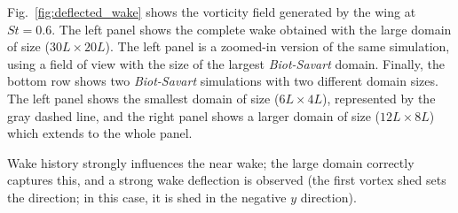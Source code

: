 \documentclass[preprint,12pt]{elsarticle}
\begin{document}
Fig.~\ref{fig:deflected_wake} shows the vorticity field generated by the wing at $St=0.6$. The left panel shows the complete wake obtained with the large domain of size ($30L\times20L$). The left panel is a zoomed-in version of the same simulation, using a field of view with the size of the largest \emph{Biot-Savart} domain. Finally, the bottom row shows two \emph{Biot-Savart} simulations with two different domain sizes. The left panel shows the smallest domain of size ($6L\times4L$), represented by the gray dashed line, and the right panel shows a larger domain of size ($12L\times8L$) which extends to the whole panel.

Wake history strongly influences the near wake; the large domain correctly captures this, and a strong wake deflection is observed (the first vortex shed sets the direction; in this case, it is shed in the negative $y$ direction).
\end{document}
